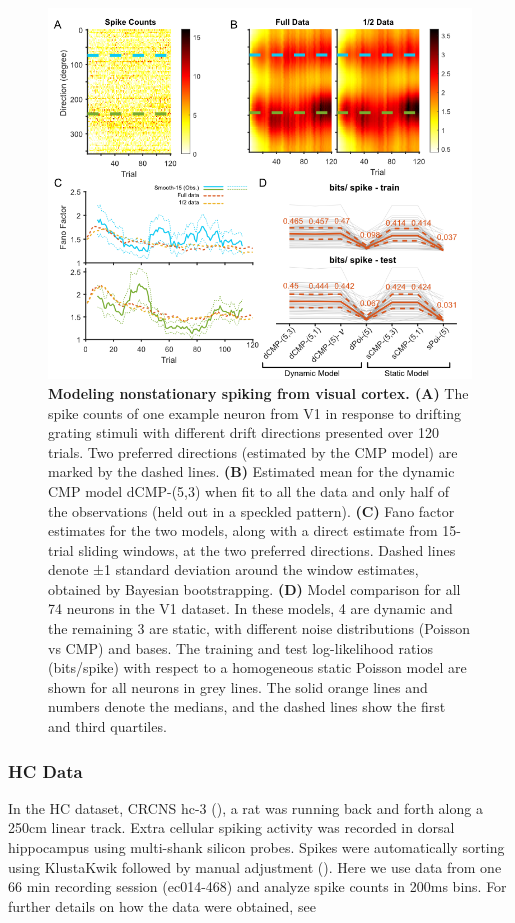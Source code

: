 \documentclass[aoas]{imsart}
\theoremstyle{plain}
\theoremstyle{remark}
\begin{document}
\begin{figure}[h!]
	\centering
	\includegraphics[width=1\textwidth]{figure4.png}
	\caption{\textbf{Modeling nonstationary spiking from visual cortex. (A)} The spike counts of one example neuron from V1 in response to drifting grating stimuli with different drift directions presented over 120 trials. Two preferred directions (estimated by the CMP model) are marked by the dashed lines. \textbf{(B)} Estimated mean for the dynamic CMP model dCMP-(5,3) when fit to all the data and only half of the observations (held out in a speckled pattern). \textbf{(C)} Fano factor estimates for the two models, along with a direct estimate from 15-trial sliding windows, at the two preferred directions. Dashed lines denote ±1 standard deviation around the window estimates, obtained by Bayesian bootstrapping. \textbf{(D)} Model comparison for all 74 neurons in the V1 dataset. In these models, 4 are dynamic and the remaining 3 are static, with different noise distributions (Poisson vs CMP) and bases. The training and test log-likelihood ratios (bits/spike) with respect to a homogeneous static Poisson model are shown for all neurons in grey lines. The solid orange lines and numbers denote the medians, and the dashed lines show the first and third quartiles.}
	\label{fig4}
\end{figure}

\subsubsection{HC Data}
In the HC dataset, CRCNS hc-3 (\cite{Mizuseki2013}), a rat was running back and forth along a 250cm linear track. Extra cellular spiking activity was recorded in dorsal hippocampus using multi-shank silicon probes. Spikes were automatically sorting using KlustaKwik followed by manual adjustment (\cite{Rossant2016}). Here we use data from one 66 min recording session (ec014-468) and analyze spike counts in 200ms bins. For further details on how the data were obtained, see \cite{Mizuseki2014}
\end{document}
